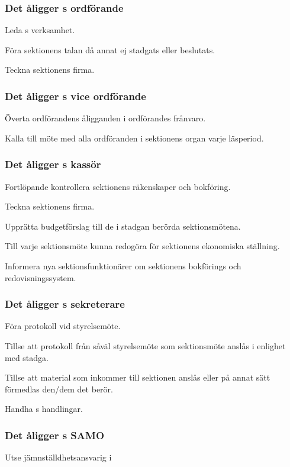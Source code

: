 \subsubsection{Det åligger \STYRIT{}s ordförande}
\begin{att}
	\item Leda \STYRIT{}s verksamhet.
	\item Föra sektionens talan då annat ej stadgats eller beslutats.
	\item Teckna sektionens firma.
\end{att}

\subsubsection{Det åligger \STYRIT{}s vice ordförande}
\begin{att}
	\item Överta ordförandens åligganden i ordförandes frånvaro.
	\item Kalla till möte med alla ordföranden i sektionens organ varje läsperiod.
\end{att}

\subsubsection{Det åligger \STYRIT{}s kassör}
\begin{att}
	\item Fortlöpande kontrollera sektionens räkenskaper och bokföring.
	\item Teckna sektionens firma.
	\item Upprätta budgetförslag till de i stadgan berörda sektionsmötena.
	\item Till varje sektionsmöte kunna redogöra för sektionens ekonomiska ställning.
	\item Informera nya sektionsfunktionärer om sektionens bokförings och redovisningssystem.
\end{att}
 
\subsubsection{Det åligger \STYRIT{}s sekreterare}
\begin{att}
	\item Föra protokoll vid styrelsemöte.
	\item Tillse att protokoll från såväl styrelsemöte som sektionsmöte anslås i enlighet med stadga.
	\item Tillse att material som inkommer till sektionen anslås eller på annat sätt förmedlas den/dem det berör.
	\item Handha \STYRIT{}s handlingar.
\end{att}

\subsubsection{Det åligger \STYRIT{}s SAMO}
\begin{att}
	\item Utse jämnställdhetsansvarig i \STYRIT
\end{att}